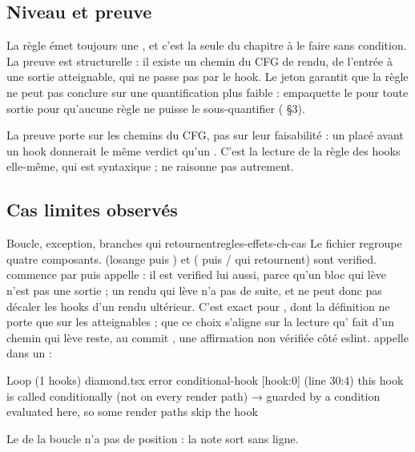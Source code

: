\subsection{Niveau et preuve}

La règle émet toujours une \Error, et c'est la seule du chapitre à le faire sans condition. La preuve est structurelle : il existe un chemin du CFG de rendu, de l'entrée à une sortie atteignable, qui ne passe pas par le hook. Le jeton garantit que la règle ne peut pas conclure sur une quantification plus faible :  empaquette le \og pour toute sortie\fg{} pour qu'aucune règle ne puisse le sous-quantifier ( §3).

\begin{remarque}
La preuve porte sur les chemins du CFG, pas sur leur faisabilité : un  placé avant un hook donnerait le même verdict qu'un . C'est la lecture de la règle des hooks elle-même, qui est syntaxique ;  ne raisonne pas autrement.
\end{remarque}

\subsection{Cas limites observés}

\begin{exemple}{Boucle, exception, branches qui retournent}{regles-effets-ch-cas}
Le fichier  regroupe quatre composants.  (losange puis ) et  ( puis / qui retournent) sont \og verified\fg{}.  commence par  puis appelle  : il est \og verified\fg{} lui aussi, parce qu'un bloc qui lève n'est pas une sortie  ; un rendu qui lève n'a pas de suite, et ne peut donc pas décaler les hooks d'un rendu ultérieur. C'est exact pour , dont la définition ne porte que sur les  atteignables ; que ce choix s'aligne sur la lecture qu' fait d'un chemin qui lève reste, au commit \snapshotCommit, une affirmation non vérifiée côté eslint.  appelle  dans un  :
\begin{sortie}
  Loop  (1 hooks)  diamond.tsx
    error  conditional-hook  [hook:0]  (line 30:4)  this hook is called conditionally (not on every render path)
       → guarded by a condition evaluated here, so some render paths skip the hook
\end{sortie}
Le  de la boucle n'a pas de position : la note sort sans ligne.
\end{exemple}

